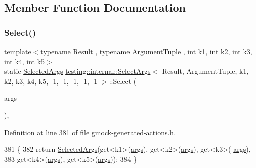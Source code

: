 \subsection{Member Function Documentation}
\mbox{\label{classtesting_1_1internal_1_1SelectArgs_3_01Result_00_01ArgumentTuple_00_01k1_00_01k2_00_01k3_00_dabb861d0dfd59e876e4adc8d7e61c25_a08f454a7721b19e327042fd2bb6bf36f}} 
\subsubsection{\texorpdfstring{Select()}{Select()}}
{\footnotesize\ttfamily template$<$typename Result , typename Argument\+Tuple , int k1, int k2, int k3, int k4, int k5$>$ \\
static \hyperlink{classtesting_1_1internal_1_1SelectArgs_3_01Result_00_01ArgumentTuple_00_01k1_00_01k2_00_01k3_00_dabb861d0dfd59e876e4adc8d7e61c25_adc02f2ce0bec0329a74a88e01a586ca1}{Selected\+Args} \hyperlink{classtesting_1_1internal_1_1SelectArgs}{testing\+::internal\+::\+Select\+Args}$<$ Result, Argument\+Tuple, k1, k2, k3, k4, k5, -\/1, -\/1, -\/1, -\/1, -\/1 $>$\+::Select (\begin{DoxyParamCaption}\item[{const Argument\+Tuple \&}]{args }\end{DoxyParamCaption})\hspace{0.3cm}{\ttfamily [inline]}, {\ttfamily [static]}}



Definition at line 381 of file gmock-\/generated-\/actions.\+h.


\begin{DoxyCode}
381                                                         \{
382     \textcolor{keywordflow}{return} \hyperlink{classtesting_1_1internal_1_1SelectArgs_3_01Result_00_01ArgumentTuple_00_01k1_00_01k2_00_01k3_00_dabb861d0dfd59e876e4adc8d7e61c25_adc02f2ce0bec0329a74a88e01a586ca1}{SelectedArgs}(get<k1>(\hyperlink{namespacegenerate__debs_a75f9143e38df82d83b2e8a6f99cae02c}{args}), get<k2>(\hyperlink{namespacegenerate__debs_a75f9143e38df82d83b2e8a6f99cae02c}{args}), get<k3>(
      \hyperlink{namespacegenerate__debs_a75f9143e38df82d83b2e8a6f99cae02c}{args}),
383         get<k4>(\hyperlink{namespacegenerate__debs_a75f9143e38df82d83b2e8a6f99cae02c}{args}), get<k5>(\hyperlink{namespacegenerate__debs_a75f9143e38df82d83b2e8a6f99cae02c}{args}));
384   \}
\end{DoxyCode}


